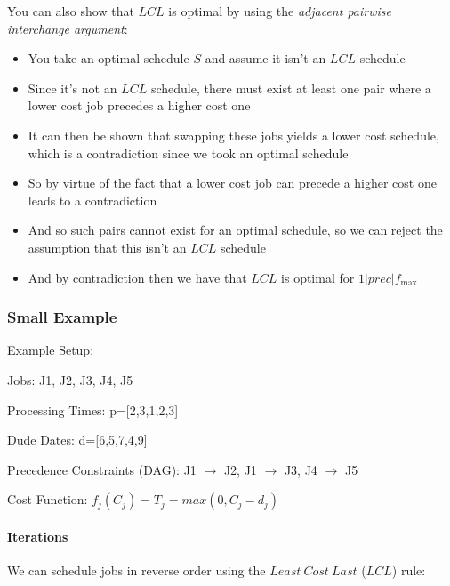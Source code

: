 \documentclass[fleqn]{article}
\begin{document}
  You can also show that $LCL$ is optimal by using the \textit{adjacent pairwise interchange argument}:
  \begin{itemize}
    \item You take an optimal schedule $S$ and assume it isn't an $LCL$ schedule
    \item Since it's not an $LCL$ schedule, there must exist at least one pair where a lower cost job precedes a higher cost one
    \item It can then be shown that swapping these jobs yields a lower cost schedule, which is a contradiction since we took an optimal schedule
    \item So by virtue of the fact that a lower cost job can precede a higher cost one leads to a contradiction
    \item And so such pairs cannot exist for an optimal schedule, so we can reject the assumption that this isn't an $LCL$ schedule
    \item And by contradiction then we have that $LCL$ is optimal for $1|prec|f_{\text{max}}$
  \end{itemize}
  
  \subsubsection*{Small Example}
  Example Setup:

    Jobs: J1, J2, J3, J4, J5

    Processing Times: p=[2,3,1,2,3]

    Dude Dates: d=[6,5,7,4,9]

    Precedence Constraints (DAG): J1 $\to$ J2, J1 $\to$ J3, J4 $\to$ J5

    Cost Function: $f_j(C_j) = T_j = max(0, C_j - d_j)$
    
    \paragraph{Iterations}
    We can schedule jobs in reverse order using the $Least\ Cost\ Last$ ($LCL$) rule:
    
\end{document}
